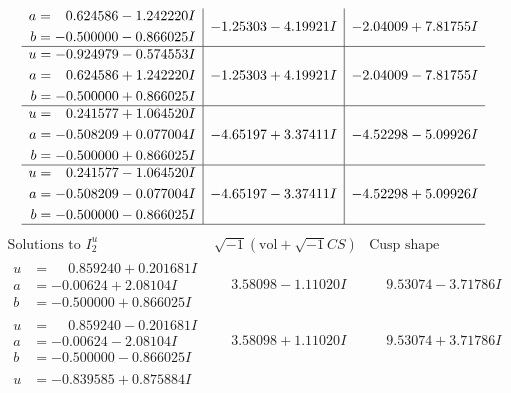 \documentclass[1p]{elsarticle_modified}
\theoremstyle{definition}
\newcommand{\I}{\sqrt{-1}}
\begin{document}
$$\begin{array}{c|c|c}
\begin{aligned}
a &= \phantom{-}0.624586 - 1.242220 I \\
b &= -0.500000 - 0.866025 I\end{aligned}
 & -1.25303 - 4.19921 I & -2.04009 + 7.81755 I \\ \hline\begin{aligned}
u &= -0.924979 - 0.574553 I \\
a &= \phantom{-}0.624586 + 1.242220 I \\
b &= -0.500000 + 0.866025 I\end{aligned}
 & -1.25303 + 4.19921 I & -2.04009 - 7.81755 I \\ \hline\begin{aligned}
u &= \phantom{-}0.241577 + 1.064520 I \\
a &= -0.508209 + 0.077004 I \\
b &= -0.500000 + 0.866025 I\end{aligned}
 & -4.65197 + 3.37411 I & -4.52298 - 5.09926 I \\ \hline\begin{aligned}
u &= \phantom{-}0.241577 - 1.064520 I \\
a &= -0.508209 - 0.077004 I \\
b &= -0.500000 - 0.866025 I\end{aligned}
 & -4.65197 - 3.37411 I & -4.52298 + 5.09926 I\\
 \hline 
 \end{array}$$\newpage$$\begin{array}{c|c|c}  
\text{Solutions to }I^u_{2}& \I (\text{vol} + \sqrt{-1}CS) & \text{Cusp shape}\\
 \hline 
\begin{aligned}
u &= \phantom{-}0.859240 + 0.201681 I \\
a &= -0.00624 + 2.08104 I \\
b &= -0.500000 + 0.866025 I\end{aligned}
 & \phantom{-}3.58098 - 1.11020 I & \phantom{-}9.53074 - 3.71786 I \\ \hline\begin{aligned}
u &= \phantom{-}0.859240 - 0.201681 I \\
a &= -0.00624 - 2.08104 I \\
b &= -0.500000 - 0.866025 I\end{aligned}
 & \phantom{-}3.58098 + 1.11020 I & \phantom{-}9.53074 + 3.71786 I \\ \hline\begin{aligned}
u &= -0.839585 + 0.875884 I \\

\end{aligned}
\end{array}$$
\end{document}
